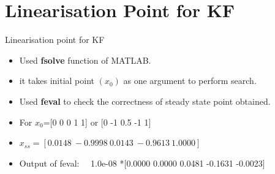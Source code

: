 \documentclass{beamer}
\begin{document}
\section{Linearisation Point for KF}
\begin{frame}{Linearisation point for KF}
\begin{itemize}
    \item Used \textbf{fsolve} function of MATLAB.
    \item it takes initial point $(x_0)$ as one argument to perform search.
    \item Used \textbf{feval} to check the correctness of steady state point obtained.
    \item For $x_0$=[0 0 0 1 1] or [0 -1 0.5 -1 1]
    \item $x_{ss}=[0.0148\ -0.9998\ 0.0143\  -0.9613\  1.0000]$
    \item Output of feval: \ \ 1.0e-08 *[0.0000    0.0000    0.0481   -0.1631   -0.0023]
\end{itemize}
    
\end{frame}
\end{document}
